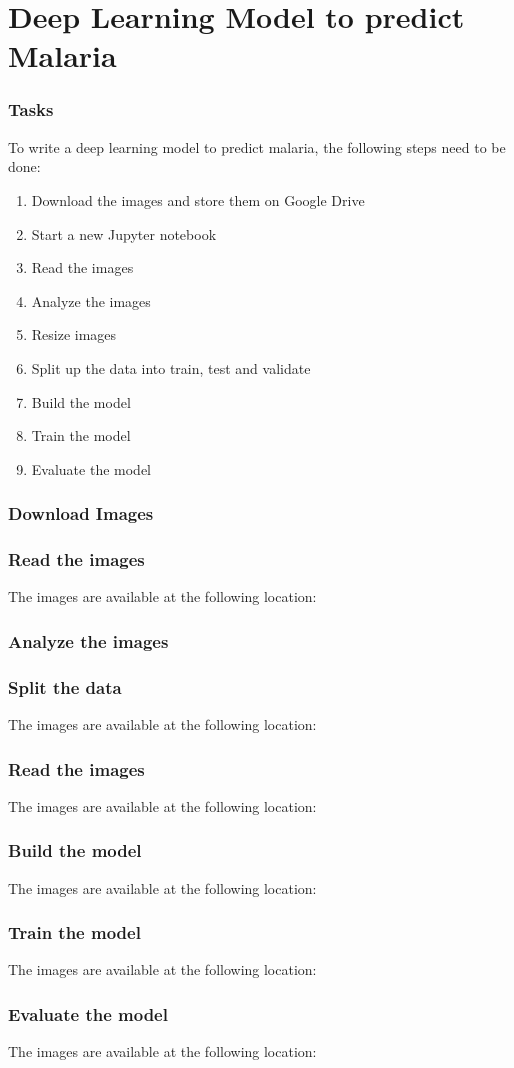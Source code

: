 \section{Deep Learning Model to predict Malaria}

\begin{frame}[fragile]
  \frametitle{Tasks}
  To write a deep learning model to predict malaria, the following
  steps need to be done:
  \begin{enumerate}
  \item Download the images and store them on Google Drive
  \item Start a new Jupyter notebook
  \item Read the images
  \item Analyze the images
  \item Resize images
  \item Split up the data into train, test and validate
  \item Build the model
  \item Train the model
  \item Evaluate the model
  \end{enumerate}
\end{frame}

\begin{frame}[fragile]
  \frametitle{Download Images}
\end{frame}

\begin{frame}[fragile]
  \frametitle{Read the images}
  The images are available at the following location:
\end{frame}

\begin{frame}[fragile]
  \frametitle{Analyze the images}
\end{frame}

\begin{frame}[fragile]
  \frametitle{Split the data}
  The images are available at the following location:
\end{frame}

\begin{frame}[fragile]
  \frametitle{Read the images}
  The images are available at the following location:
\end{frame}

\begin{frame}[fragile]
  \frametitle{Build the model}
  The images are available at the following location:
\end{frame}

\begin{frame}[fragile]
  \frametitle{Train the model}
  The images are available at the following location:
\end{frame}

\begin{frame}[fragile]
  \frametitle{Evaluate the model}
  The images are available at the following location:
\end{frame}
